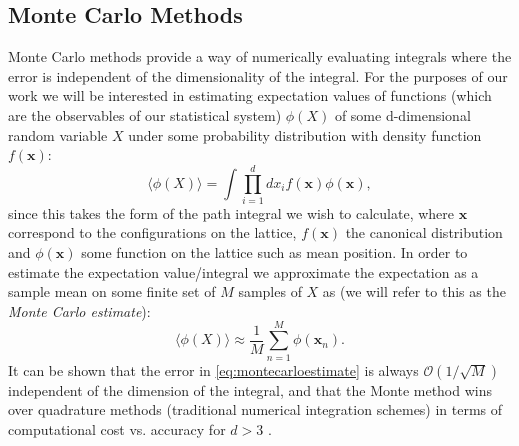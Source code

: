 \documentclass[12pt]{article}
\begin{document}
    \subsection{Monte Carlo Methods}
    Monte Carlo methods provide a way of numerically evaluating integrals where the error is independent of the dimensionality of the integral. For the purposes of our work we will be interested in estimating expectation values of functions (which are the observables of our statistical system) $\phi\left(X\right)$ of some d-dimensional random variable $X$ under some probability distribution with density function $f\left(\bm{x}\right)$:
    \begin{equation}
        \label{eq:expectation}
        \langle \phi\left(X\right) \rangle = \int \prod_{i=1}^{d}{dx_i}f\left(\bm{x}\right)\phi\left(\bm{x}\right),
    \end{equation}
    since this takes the form of the path integral we wish to calculate, where $\bm{x}$ correspond to the configurations on the lattice, $f\left(\bm{x}\right)$ the canonical distribution and $\phi\left(\bm{x}\right)$ some function on the lattice such as mean position. In order to estimate the expectation value/integral we approximate the expectation as a sample mean on some finite set of $M$ samples of $X$ as (we will refer to this as the \textit{Monte Carlo estimate}):
    \begin{equation}
        \label{eq:montecarloestimate}
        \langle\phi\left(X\right)\rangle \approx \frac{1}{M} \sum_{n=1}^{M}\phi\left(\bm{x}_n\right).
    \end{equation}
    It can be shown that the error in \ref{eq:montecarloestimate} is always $\mathcal{O}\left(1/\sqrt{M}\right)$ independent of the dimension of the integral, and that the Monte method wins over quadrature methods (traditional numerical integration schemes) in terms of computational cost vs. accuracy for $d>3$ \cite{gattringer_lang_2013}.
\end{document}
